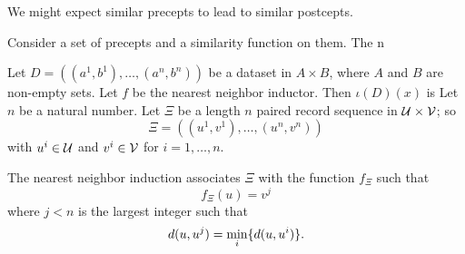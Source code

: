 
\sbasic

























\sstart
{}


We might expect similar precepts to lead to similar postcepts.


Consider a set of precepts and a similarity function on them.
The n


Let $D = ((a^1, b^1), \dots, (a^n, b^n))$ be a dataset in $A \times B$, where $A$ and $B$ are non-empty sets.
Let $f$ be the nearest neighbor inductor.
Then $\iota(D)(x)$ is
Let $n$ be a natural number.
Let $\Xi$ be a length $n$ paired record sequence
in $\mathcal{U} \times \mathcal{V}$; so
\[
  \Xi = ((u^1, v^1), \dots, (u^n, v^n))
\]
with $u^i \in \mathcal{U}$ and $v^i \in \mathcal{V}$ for $i = 1,\dots,n$.

The nearest neighbor induction associates
$\Xi$ with the function $f_{\Xi}$ such that
\[
  f_{\Xi}(u) = v^j
\]
where $j < n$ is the largest integer such that
\[
  d(u, u^j) = \min_{i} \{d(u, u^i)\}.
\]
\strats
